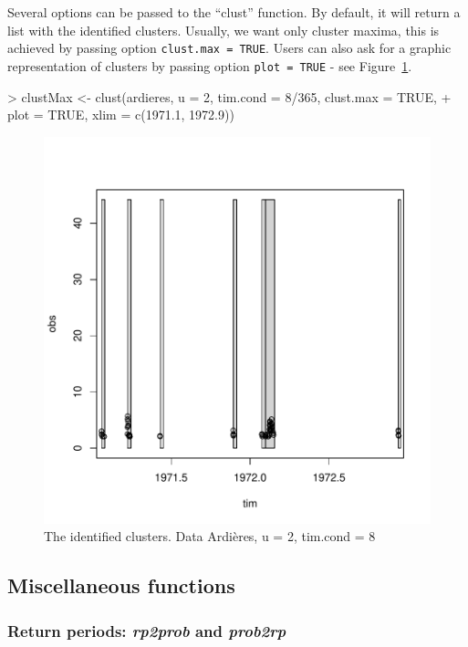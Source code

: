 \documentclass[a4paper]{article}
\numberwithin{equation}{section}
\theoremstyle{definition}
\begin{document}
Several options can be passed to the ``clust'' function. By default,
it will return a list with the identified clusters. Usually, we want
only cluster maxima, this is achieved by passing option
\verb|clust.max = TRUE|. Users can also ask for a graphic
representation of clusters by passing option \verb|plot = TRUE| - see
Figure~\ref{fig:clust}.
\begin{Schunk}
\begin{Sinput}
> clustMax <- clust(ardieres, u = 2, tim.cond = 8/365, clust.max = TRUE, 
+     plot = TRUE, xlim = c(1971.1, 1972.9))
\end{Sinput}
\end{Schunk}
 

\begin{figure}
\centering
\includegraphics{guide-032}
\caption{The identified clusters. Data Ardi\`eres, u = 2, tim.cond = 8}
\label{fig:clust}
\end{figure}

\subsection{Miscellaneous functions}
\label{subsec:miscFunc}

\subsubsection{Return periods: \emph{rp2prob} and \emph{prob2rp}}
\end{document}
